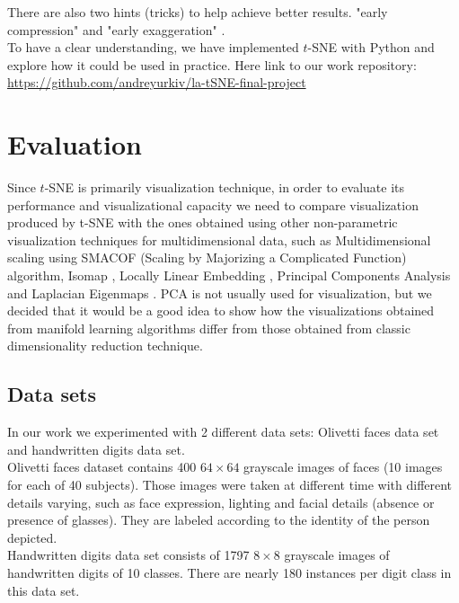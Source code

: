 There are also two hints (tricks) to help achieve better results. "early compression" and "early exaggeration" \cite{tsnearticle}.\\

To have a clear understanding, we have implemented $t$-SNE with Python and explore how it could be used in practice. Here link to our work repository:\\

\url{https://github.com/andreyurkiv/la-tSNE-final-project}

\section{Evaluation}

Since $t$-SNE is primarily visualization technique, in order to evaluate its performance and visualizational capacity we need to compare visualization produced by t-SNE with the ones obtained using other non-parametric visualization techniques for multidimensional data, such as Multidimensional scaling \cite{mds} using SMACOF (Scaling by Majorizing a Complicated Function) algorithm, Isomap \cite{isomap}, Locally Linear Embedding \cite{lle}, Principal Components Analysis \cite{pca} and Laplacian Eigenmaps \cite{lapeig}. PCA is not usually used for visualization, but we decided that it would be a good idea to show how the visualizations obtained from manifold learning algorithms differ from those obtained from classic dimensionality reduction technique.

\subsection{Data sets}

In our work we experimented with 2 different data sets: Olivetti faces data set and handwritten digits data set.\\ 

Olivetti faces dataset contains 400 $64 \times 64$ grayscale images of faces (10 images for each of 40 subjects). Those images were taken at different time with different details varying, such as face expression, lighting and facial details (absence or presence of glasses). They are labeled according to the identity of the person depicted.\\

Handwritten digits data set consists of 1797 $8 \times 8$ grayscale images of handwritten digits of 10 classes. There are nearly 180 instances per digit class in this data set.


